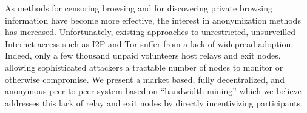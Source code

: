 
\noindent
As methods for censoring browsing and for discovering private browsing information have become more effective, the interest in anonymization methods has increased. Unfortunately, existing approaches to unrestricted, unsurveilled Internet access such as I2P and Tor suffer from a lack of widepread adoption.  Indeed,  only a few thousand unpaid volunteers host relays and exit nodes, allowing sophisticated attackers a tractable number of nodes to monitor or otherwise compromise. We present a market based, fully decentralized, and anonymous peer-to-peer system based on “bandwidth mining” which we believe addresses this lack of relay and exit nodes by directly incentivizing participants.

\begin{comment}
The Internet's current structure is the product of two forces: (1)
what is easy to implement for a small to medium sized company, and
(2) the desires of mankind.

Unfortunately, not all desires of mankind have proved agreeable. For
example, as methods for censoring browsing and discovering private
browsing information have improved, consumers have found themselves
in the unenviable position of needing to decide between their
privacy and usable Internet access. Even for those willing to suffer
the usability hit, current methods to achieve unrestricted,
unsurveilled Internet access such as I2P and Tor suffer from a
tragedy of the commons – only a few thousand unpaid volunteers host
proxies and exit nodes, allowing sophisticated attackers a tractable
number of nodes to monitor or otherwise compromise.

Similarly, not all desirable services have proved easy to
implement. Perverse economic incentives stemming from widely
available free content have resulted in a news media bereft of
subscribers, slowly descending into a minute-to-minute battle for
clicks. The high cost of distributing video has resulted in
centralization, platforms, and burdens on content creators. The
difficulty of maintaining and securing a sever have resulted in less
diversity than one might have hoped for.

To address these issues, we present a high performance approach to
networking built on a foundation of micropayments, and as an initial
application of the technology, build an uncensorable, anonymous
mechanism for accessing the global Internet. It is our hope that as
the tokens gain in acceptance, many millions of websites will
incorporate the payment models described here, and consumers will
receive a monthly budget of tokens from their ISP.
\end{comment}

